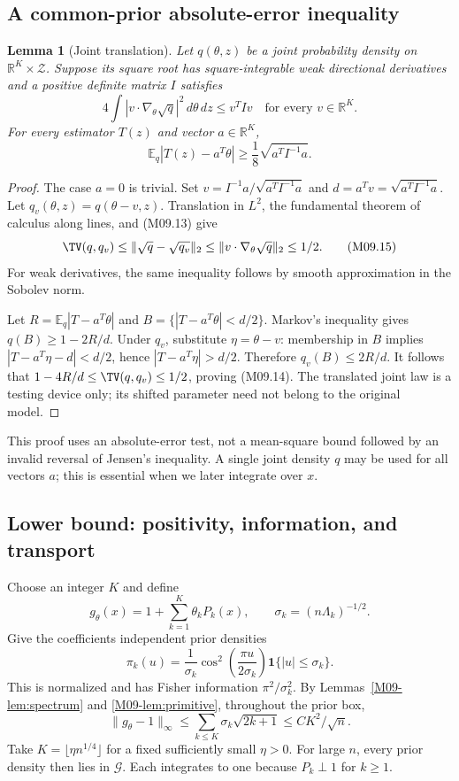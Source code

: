 \documentclass[11pt,a4paper]{article}
\newtheorem{lemma}[theorem]{Lemma}
\theoremstyle{definition}\newtheorem{definition}[theorem]{Definition}
\theoremstyle{remark}\newtheorem{remark}[theorem]{Remark}
\newcommand{\R}{\mathbb R}\newcommand{\C}{\mathbb C}\newcommand{\N}{\mathbb N}
\newcommand{\E}{\mathbb E}\newcommand{\one}{\mathbf 1}\newcommand{\1}{\mathbf 1}
\numberwithin{equation}{section}
\begin{document}
\subsection{A common-prior absolute-error inequality}\label{M09-sec-4}
\begin{lemma}[Joint translation]\label{M09-lem:shift}
Let $q(\theta,z)$ be a joint probability density on $\R^K\times\mathcal Z$. Suppose its square root has square-integrable weak directional derivatives and a positive definite matrix $I$ satisfies
\[
 4\int |v\cdot\nabla_\theta\sqrt q|^2\,d\theta\,dz\le v^TIv
 \quad\text{for every }v\in\R^K.\tag{M09.13}
\]
For every estimator $T(z)$ and vector $a\in\R^K$,
\[
 \E_q|T(z)-a^T\theta|\ge\frac18\sqrt{a^TI^{-1}a}.\tag{M09.14}
\]
\end{lemma}
\begin{proof}
The case $a=0$ is trivial. Set $v=I^{-1}a/\sqrt{a^TI^{-1}a}$ and $d=a^Tv=\sqrt{a^TI^{-1}a}$. Let $q_v(\theta,z)=q(\theta-v,z)$. Translation in $L^2$, the fundamental theorem of calculus along lines, and (M09.13) give
\[
 \TV(q,q_v)\le\|\sqrt q-\sqrt{q_v}\|_2
 \le\|v\cdot\nabla_\theta\sqrt q\|_2\le1/2.\tag{M09.15}
\]
For weak derivatives, the same inequality follows by smooth approximation in the Sobolev norm.

Let $R=\E_q|T-a^T\theta|$ and $B=\{|T-a^T\theta|<d/2\}$. Markov's inequality gives $q(B)\ge1-2R/d$. Under $q_v$, substitute $\eta=\theta-v$: membership in $B$ implies $|T-a^T\eta-d|<d/2$, hence $|T-a^T\eta|>d/2$. Therefore $q_v(B)\le2R/d$. It follows that $1-4R/d\le\TV(q,q_v)\le1/2$, proving (M09.14). The translated joint law is a testing device only; its shifted parameter need not belong to the original model.
\end{proof}
This proof uses an absolute-error test, not a mean-square bound followed by an invalid reversal of Jensen's inequality. A single joint density $q$ may be used for all vectors $a$; this is essential when we later integrate over $x$.

\subsection{Lower bound: positivity, information, and transport}\label{M09-sec-5}
Choose an integer $K$ and define
\[
 g_\theta(x)=1+\sum_{k=1}^K\theta_kP_k(x),\qquad
 \sigma_k=(n\Lambda_k)^{-1/2}.
\]
Give the coefficients independent prior densities
\[
 \pi_k(u)=\frac1{\sigma_k}\cos^2\left(\frac{\pi u}{2\sigma_k}\right)
             \1\{|u|\le\sigma_k\}.\tag{M09.16}
\]
This is normalized and has Fisher information $\pi^2/\sigma_k^2$. By Lemmas~\ref{M09-lem:spectrum} and \ref{M09-lem:primitive}, throughout the prior box,
\[
 \|g_\theta-1\|_\infty
 \le\sum_{k\le K}\sigma_k\sqrt{2k+1}
 \le C K^2/\sqrt n.\tag{M09.17}
\]
Take $K=\lfloor\eta n^{1/4}\rfloor$ for a fixed sufficiently small $\eta>0$. For large $n$, every prior density then lies in $\mathcal G$. Each integrates to one because $P_k\perp1$ for $k\ge1$.
\end{document}
